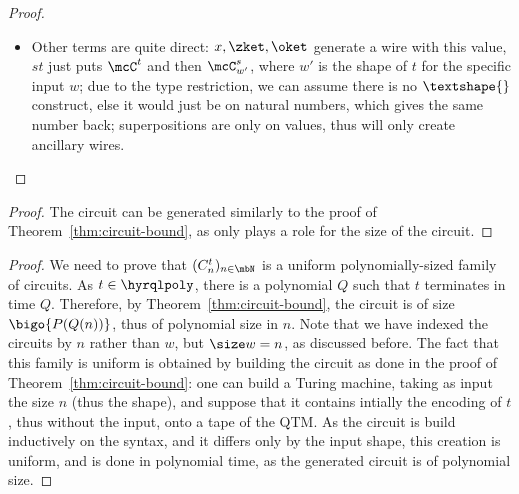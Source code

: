 \begin{proof}
\begin{itemize}
      $\mcC_{w'}^s$, replacing the box $f$ in our circuit, but for the
      new corresponding input shape $w'$. Such process will terminate, as $t$
      terminates, thus there is only a finite number of recursive calls.
      In the worst case, we have added $T(k)$ circuits, thus the total size is
      $T(k)P(T(k)) = P'(T(k))$, for $P' = XP \in \mbN[X]$.
    \item Other terms are quite direct: $x, \zket, \oket$ generate a wire with
      this value, $st$ just puts $\mcC^t$ and then $\mcC_{w'}^s$, where $w'$ is
      the shape of $t$ for the specific input $w$; due to the type restriction,
      we can assume there is no $\textshape{}$ construct, else it would just be
      on natural numbers, which gives the same number back; superpositions are
      only on values, thus will only create ancillary wires. \qedhere
  \end{itemize}
\end{proof}

\circuitexistence*

\begin{proof}
  The circuit can be generated similarly to the proof of
  Theorem~\ref{thm:circuit-bound}, as \boundedrec{} only plays a role for the
  size of the circuit.
\end{proof}

\fbqpsound*

\begin{proof}
  We need to prove that $(C_n^t)_{n \in \mbN}$ is a uniform polynomially-sized
  family of circuits. As $t \in \hyrqlpoly$, there is a polynomial $Q$ such
  that $t$ terminates in time $Q$. Therefore, by
  Theorem~\ref{thm:circuit-bound}, the circuit is of size $\bigo{P(Q(n))}$,
  thus of polynomial size in $n$. Note that we have indexed the circuits by $n$
  rather than $w$, but $\size w = n$, as discussed before. The fact that this
  family is uniform is obtained by building the circuit as done in the proof of
  Theorem~\ref{thm:circuit-bound}: one can build a Turing machine, taking as
  input the size $n$ (thus the shape), and suppose that it contains intially
  the encoding of $t$, thus without the input, onto a tape of the QTM. As the
  circuit is build inductively on the syntax, and it differs only by the input
  shape, this creation is uniform, and is done in polynomial time, as the
  generated circuit is of polynomial size.
\end{proof}

\fbqpcomplete*

